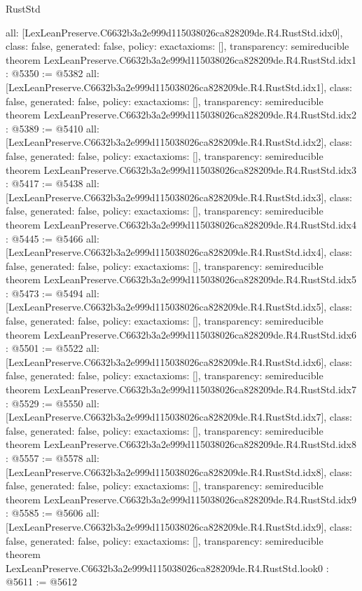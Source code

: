 \begin{lexlean}{RustStd}
\begin{coremodule}
{  all: [LexLeanPreserve.C6632b3a2e999d115038026ca828209de.R4.RustStd.idx0],
  class: false,
  generated: false,
  policy: exact{axioms: []},
  transparency: semireducible
}
theorem LexLeanPreserve.C6632b3a2e999d115038026ca828209de.R4.RustStd.idx1 : @5350 := @5382 {
  all: [LexLeanPreserve.C6632b3a2e999d115038026ca828209de.R4.RustStd.idx1],
  class: false,
  generated: false,
  policy: exact{axioms: []},
  transparency: semireducible
}
theorem LexLeanPreserve.C6632b3a2e999d115038026ca828209de.R4.RustStd.idx2 : @5389 := @5410 {
  all: [LexLeanPreserve.C6632b3a2e999d115038026ca828209de.R4.RustStd.idx2],
  class: false,
  generated: false,
  policy: exact{axioms: []},
  transparency: semireducible
}
theorem LexLeanPreserve.C6632b3a2e999d115038026ca828209de.R4.RustStd.idx3 : @5417 := @5438 {
  all: [LexLeanPreserve.C6632b3a2e999d115038026ca828209de.R4.RustStd.idx3],
  class: false,
  generated: false,
  policy: exact{axioms: []},
  transparency: semireducible
}
theorem LexLeanPreserve.C6632b3a2e999d115038026ca828209de.R4.RustStd.idx4 : @5445 := @5466 {
  all: [LexLeanPreserve.C6632b3a2e999d115038026ca828209de.R4.RustStd.idx4],
  class: false,
  generated: false,
  policy: exact{axioms: []},
  transparency: semireducible
}
theorem LexLeanPreserve.C6632b3a2e999d115038026ca828209de.R4.RustStd.idx5 : @5473 := @5494 {
  all: [LexLeanPreserve.C6632b3a2e999d115038026ca828209de.R4.RustStd.idx5],
  class: false,
  generated: false,
  policy: exact{axioms: []},
  transparency: semireducible
}
theorem LexLeanPreserve.C6632b3a2e999d115038026ca828209de.R4.RustStd.idx6 : @5501 := @5522 {
  all: [LexLeanPreserve.C6632b3a2e999d115038026ca828209de.R4.RustStd.idx6],
  class: false,
  generated: false,
  policy: exact{axioms: []},
  transparency: semireducible
}
theorem LexLeanPreserve.C6632b3a2e999d115038026ca828209de.R4.RustStd.idx7 : @5529 := @5550 {
  all: [LexLeanPreserve.C6632b3a2e999d115038026ca828209de.R4.RustStd.idx7],
  class: false,
  generated: false,
  policy: exact{axioms: []},
  transparency: semireducible
}
theorem LexLeanPreserve.C6632b3a2e999d115038026ca828209de.R4.RustStd.idx8 : @5557 := @5578 {
  all: [LexLeanPreserve.C6632b3a2e999d115038026ca828209de.R4.RustStd.idx8],
  class: false,
  generated: false,
  policy: exact{axioms: []},
  transparency: semireducible
}
theorem LexLeanPreserve.C6632b3a2e999d115038026ca828209de.R4.RustStd.idx9 : @5585 := @5606 {
  all: [LexLeanPreserve.C6632b3a2e999d115038026ca828209de.R4.RustStd.idx9],
  class: false,
  generated: false,
  policy: exact{axioms: []},
  transparency: semireducible
}
theorem LexLeanPreserve.C6632b3a2e999d115038026ca828209de.R4.RustStd.look0 : @5611 := @5612 {
}
\end{coremodule}
\end{lexlean}

